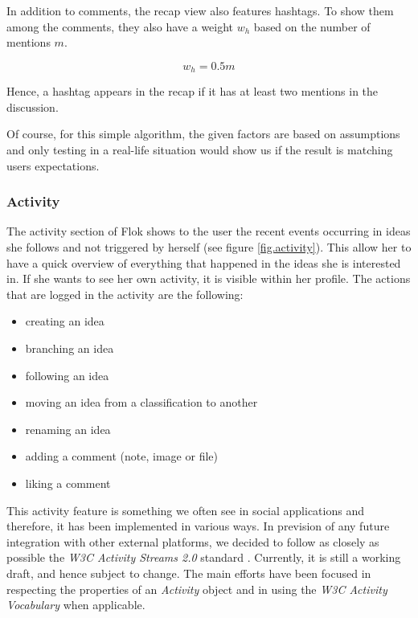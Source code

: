 \documentclass[a4paper,12pt, oneside]{article}
\begin{document}
In addition to comments, the recap view also features hashtags.
To show them among the comments, they also have a weight $w_h$ based on the number of mentions $m$.

\begin{equation}
    \label{eq.hashtagWeightInRecap}
    w_h = 0.5m
\end{equation}

Hence, a hashtag appears in the recap if it has at least two mentions in the discussion.

Of course, for this simple algorithm, the given factors are based on assumptions and only testing in a real-life situation would show us if the result is matching users expectations.

\subsubsection{Activity}
The activity section of Flok shows to the user the recent events occurring in ideas she follows and not triggered by herself (see figure \ref{fig.activity}).
This allow her to have a quick overview of everything that happened in the ideas she is interested in.
If she wants to see her own activity, it is visible within her profile.
The actions that are logged in the activity are the following:
\begin{multicols}{2}
    \begin{itemize}
        \item creating an idea
        \item branching an idea
        \item following an idea
        \item moving an idea from a classification to another
        \item renaming an idea
        \item adding a comment (note, image or file)
        \item liking a comment
    \end{itemize}
\end{multicols}

This activity feature is something we often see in social applications and therefore, it has been implemented in various ways.
In prevision of any future integration with other external platforms, we decided to follow as closely as possible the \emph{W3C Activity Streams 2.0} standard \cite{snell2015AS2}.
Currently, it is still a working draft, and hence subject to change.
The main efforts have been focused in respecting the properties of an \emph{Activity} object and in using the \emph{W3C Activity Vocabulary} \cite{snell2015AV} when applicable.
\end{document}
